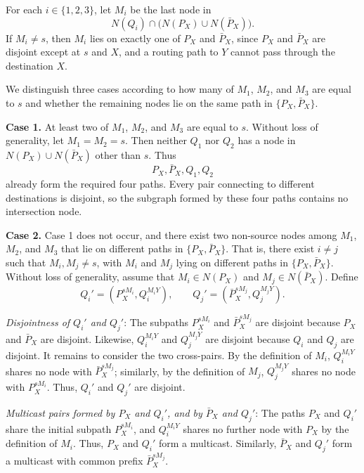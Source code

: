 \documentclass[11pt]{article}
\begin{document}
For each \(i\in\{1,2,3\}\), let \(M_i\) be the last node in
\begin{equation}\label{eq: 1}
    N(Q_i)\cap\bigl(N(P_X)\cup N(\bar P_X)\bigr).
\end{equation}
If \(M_i\neq s\), then \(M_i\) lies on exactly one of \(P_X\) and \(\bar P_X\), since \(P_X\) and \(\bar P_X\) are disjoint except at \(s\) and \(X\), and a routing path to \(Y\) cannot pass through the destination \(X\).

We distinguish three cases according to how many of \(M_1\), \(M_2\), and \(M_3\) are equal to \(s\) and whether the remaining nodes lie on the same path in \(\{P_X,\bar P_X\}\).

\smallskip
\noindent\textbf{Case 1.}
At least two of \(M_1\), \(M_2\), and \(M_3\) are equal to \(s\). Without loss of generality, let \(M_1=M_2=s\). Then neither \(Q_1\) nor \(Q_2\) has a node in \(N(P_X)\cup N(\bar P_X)\) other than \(s\). Thus
\[
P_X, \bar P_X, Q_1, Q_2
\]
already form the required four paths.
Every pair connecting to different destinations is disjoint, so the subgraph formed by these four paths contains no intersection node.

\smallskip
\noindent\textbf{Case 2.}
Case 1 does not occur, and there exist two non-source nodes among \(M_1\), \(M_2\), and \(M_3\) that lie on different paths in \(\{P_X,\bar P_X\}\). That is, there exist \(i\neq j\) such that \(M_i,M_j\neq s\), with \(M_i\) and \(M_j\) lying on different paths in \(\{P_X,\bar P_X\}\). Without loss of generality, assume that \(M_i\in N(P_X)\) and \(M_j\in N(\bar P_X)\). Define
\[
Q_i'=(P_X^{sM_i},Q_i^{M_iY}),
\qquad
Q_j'=(\bar P_X^{sM_j},Q_j^{M_jY}).
\]
\par\vspace{0.4em}
\noindent\emph{Disjointness of \(Q_i'\) and \(Q_j'\)}:
The subpaths \(P_X^{sM_i}\) and \(\bar P_X^{sM_j}\) are disjoint because \(P_X\) and \(\bar P_X\) are disjoint. Likewise, \(Q_i^{M_iY}\) and \(Q_j^{M_jY}\) are disjoint because \(Q_i\) and \(Q_j\) are disjoint. It remains to consider the two cross-pairs. By the definition of \(M_i\), \(Q_i^{M_iY}\) shares no node with \(\bar P_X^{sM_j}\); similarly, by the definition of \(M_j\), \(Q_j^{M_jY}\) shares no node with \(P_X^{sM_i}\). Thus, \(Q_i'\) and \(Q_j'\) are disjoint.

\par\vspace{0.4em}
\noindent\emph{Multicast pairs formed by \(P_X\) and \(Q_i'\), and by \(\bar P_X\) and \(Q_j'\)}:
The paths \(P_X\) and \(Q_i'\) share the initial subpath \(P_X^{sM_i}\), and \(Q_i^{M_iY}\) shares no further node with \(P_X\) by the definition of \(M_i\). Thus, \(P_X\) and \(Q_i'\) form a multicast. Similarly, \(\bar P_X\) and \(Q_j'\) form a multicast with common prefix \(\bar P_X^{sM_j}\).
\end{document}
